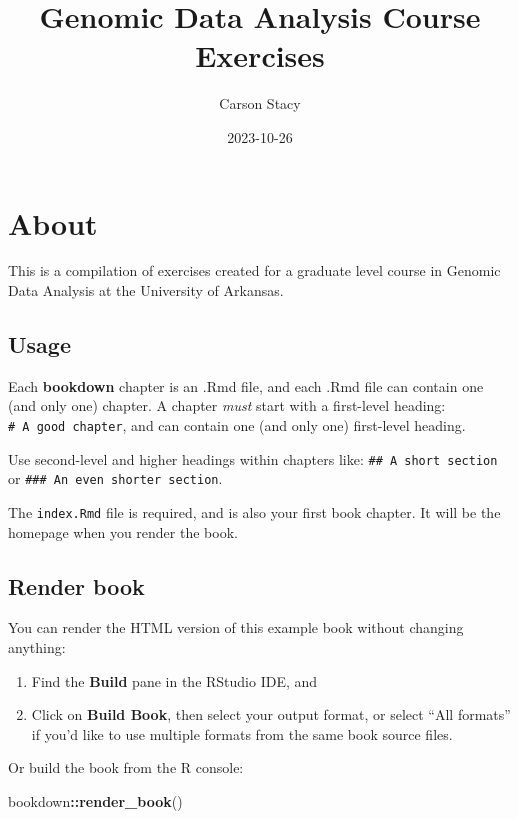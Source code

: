 \documentclass[
]{book}
\title{Genomic Data Analysis Course Exercises}
\author{Carson Stacy}
\date{2023-10-26}
\newenvironment{Shaded}{\begin{snugshade}}{\end{snugshade}}
\newcommand{\FunctionTok}[1]{\textcolor[rgb]{0.13,0.29,0.53}{\textbf{#1}}}
\newcommand{\NormalTok}[1]{#1}
\newcommand{\SpecialCharTok}[1]{\textcolor[rgb]{0.81,0.36,0.00}{\textbf{#1}}}
\theoremstyle{definition}
\theoremstyle{definition}
\theoremstyle{definition}
\theoremstyle{definition}
\theoremstyle{remark}
\begin{document}
\maketitle

{
\setcounter{tocdepth}{1}
\tableofcontents
}
\hypertarget{about}{%
\chapter{About}\label{about}}

This is a compilation of exercises created for a graduate level course in Genomic Data Analysis at the University of Arkansas.

\hypertarget{usage}{%
\section{Usage}\label{usage}}

Each \textbf{bookdown} chapter is an .Rmd file, and each .Rmd file can contain one (and only one) chapter. A chapter \emph{must} start with a first-level heading: \texttt{\#\ A\ good\ chapter}, and can contain one (and only one) first-level heading.

Use second-level and higher headings within chapters like: \texttt{\#\#\ A\ short\ section} or \texttt{\#\#\#\ An\ even\ shorter\ section}.

The \texttt{index.Rmd} file is required, and is also your first book chapter. It will be the homepage when you render the book.

\hypertarget{render-book}{%
\section{Render book}\label{render-book}}

You can render the HTML version of this example book without changing anything:

\begin{enumerate}
\def\labelenumi{\arabic{enumi}.}
\item
  Find the \textbf{Build} pane in the RStudio IDE, and
\item
  Click on \textbf{Build Book}, then select your output format, or select ``All formats'' if you'd like to use multiple formats from the same book source files.
\end{enumerate}

Or build the book from the R console:

\begin{Shaded}
\begin{Highlighting}[]
\NormalTok{bookdown}\SpecialCharTok{::}\FunctionTok{render\_book}\NormalTok{()}
\end{Highlighting}
\end{Shaded}
\end{document}

